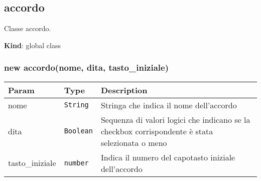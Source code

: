 \protect\hypertarget{accordo}{}{}

\hypertarget{accordo}{%
\subsection{accordo}\label{accordo}}

Classe accordo.

\textbf{Kind}: global class\\
\protect\hypertarget{new_accordo_new}{}{}

\hypertarget{new-accordonome-dita-tasto_iniziale}{%
\subsubsection{new accordo(nome, dita,
tasto\_iniziale)}\label{new-accordonome-dita-tasto_iniziale}}

\begin{tabularx}{\textwidth}{XXX}
\toprule
\begin{minipage}[b]{0.30\columnwidth}\raggedright
Param\strut
\end{minipage} & \begin{minipage}[b]{0.30\columnwidth}\raggedright
Type\strut
\end{minipage} & \begin{minipage}[b]{0.30\columnwidth}\raggedright
Description\strut
\end{minipage}\tabularnewline
\midrule
\endhead
\begin{minipage}[t]{0.30\columnwidth}\raggedright
nome\strut
\end{minipage} & \begin{minipage}[t]{0.30\columnwidth}\raggedright
\texttt{String}\strut
\end{minipage} & \begin{minipage}[t]{0.30\columnwidth}\raggedright
Stringa che indica il nome dell'accordo\strut
\end{minipage}\tabularnewline
\begin{minipage}[t]{0.30\columnwidth}\raggedright
dita\strut
\end{minipage} & \begin{minipage}[t]{0.30\columnwidth}\raggedright
\texttt{Boolean}\strut
\end{minipage} & \begin{minipage}[t]{0.30\columnwidth}\raggedright
Sequenza di valori logici che indicano se la checkbox corrispondente è
stata selezionata o meno\strut
\end{minipage}\tabularnewline
\begin{minipage}[t]{0.30\columnwidth}\raggedright
tasto\_iniziale\strut
\end{minipage} & \begin{minipage}[t]{0.30\columnwidth}\raggedright
\texttt{number}\strut
\end{minipage} & \begin{minipage}[t]{0.30\columnwidth}\raggedright
Indica il numero del capotasto iniziale dell'accordo\strut
\end{minipage}\tabularnewline
\bottomrule
\end{tabularx}

